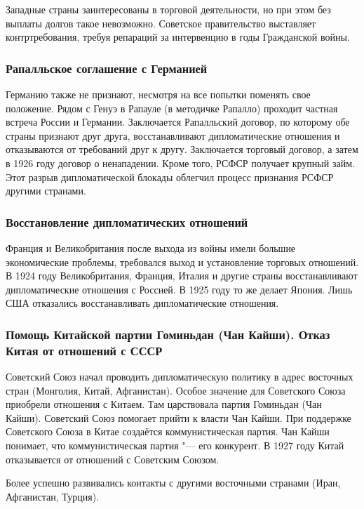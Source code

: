 Западные страны заинтересованы в торговой деятельности, но при этом без выплаты долгов такое невозможно. Советское правительство выставляет контртребования, требуя репараций за интервенцию в годы Гражданской войны. 

\subsubsection{\textbf{Рапалльское соглашение с Германией}}

Германию также не признают, несмотря на все попытки поменять свое положение. Рядом с Генуэ в Рапауле (в методичке Рапалло) проходит частная встреча России и Германии. Заключается Рапалльский договор, по которому обе страны признают друг друга, восстанавливают дипломатические отношения и отказываются от требований друг к другу. Заключается торговый договор, а затем в 1926 году договор о ненападении. Кроме того, РСФСР получает крупный займ. Этот разрыв дипломатической блокады облегчил процесс признания РСФСР другими странами. 

\subsubsection{\textbf{Восстановление дипломатических отношений}}

Франция и Великобритания после выхода из войны имели большие экономические проблемы, требовался выход и установление торговых отношений. В 1924 году Великобритания, Франция, Италия и другие страны восстанавливают дипломатические отношения с Россией. В 1925 году то же делает Япония. Лишь США отказались восстанавливать дипломатические отношения.

\subsubsection{\textbf{Помощь Китайской партии Гоминьдан (Чан Кайши). Отказ Китая от отношений с СССР}}

Советский Союз начал проводить дипломатическую политику в адрес восточных стран (Монголия, Китай, Афганистан). Особое значение для Советского Союза приобрели отношения с Китаем. Там царствовала партия Гоминьдан (Чан Кайши). Советский Союз помогает прийти к власти Чан Кайши. При поддержке Советского Союза в Китае создаётся коммунистическая партия. Чан Кайши понимает, что коммунистическая партия "--- его конкурент. В 1927 году Китай отказывается от отношений с Советским Союзом.

Более успешно развивались контакты с другими восточными странами (Иран, Афганистан, Турция). 

